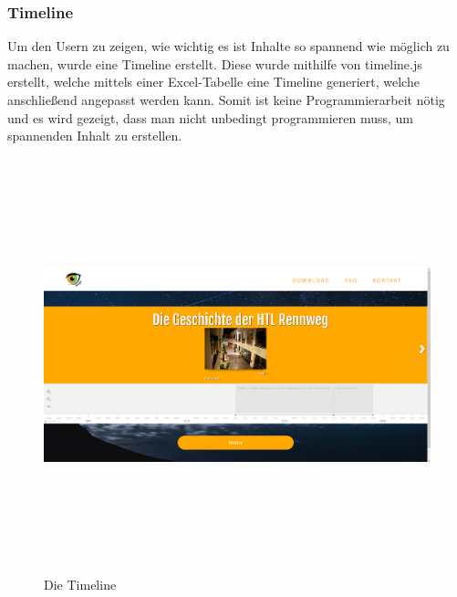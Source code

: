 \subsubsection{Timeline}
Um den Usern zu zeigen, wie wichtig es ist Inhalte so spannend wie möglich zu machen, wurde eine Timeline erstellt. Diese wurde mithilfe von timeline.js erstellt, welche mittels einer Excel-Tabelle eine Timeline generiert, welche anschließend angepasst werden kann. Somit ist keine Programmierarbeit nötig und es wird gezeigt, dass man nicht unbedingt programmieren muss, um spannenden Inhalt zu erstellen.
\begin{figure} [h]
	\centering
\includegraphics[width=12cm,height=12cm,keepaspectratio]{webseite_timeline} 
	\caption{Die Timeline}
\end{figure}

